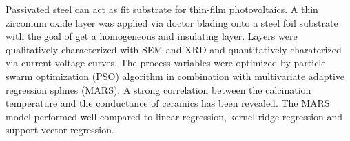 Passivated steel can act as fit substrate for thin-film photovoltaics.
A thin zirconium oxide layer was applied via doctor blading onto a steel foil substrate with the goal of get a homogeneous and insulating layer.
Layers were qualitatively characterized with SEM and XRD and quantitatively charaterized via current-voltage curves.
The process variables were optimized by particle swarm optimization (PSO) algorithm in combination with multivariate adaptive regression splines (MARS).
A strong correlation between the calcination temperature and the conductance of ceramics has been revealed. 
The MARS model performed well compared to 
linear regression, kernel ridge regression and support vector regression.
